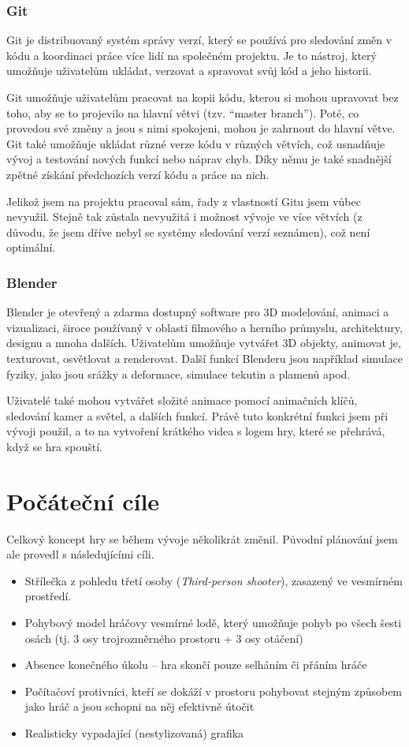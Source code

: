 \documentclass[12pt,a4paper,hidelinks]{article}
\begin{document}
\subsubsection{Git}
Git\cite{git} je distribuovaný systém správy verzí, který se používá pro sledování změn v kódu a koordinaci práce více lidí na společném projektu. Je to nástroj, který umožňuje uživatelům ukládat, verzovat a spravovat svůj kód a jeho historii.

Git umožňuje uživatelům pracovat na kopii kódu, kterou si mohou upravovat bez toho, aby se to projevilo na hlavní větvi (tzv. \enquote{master branch}). Poté, co provedou své změny a jsou s nimi spokojeni, mohou je zahrnout do hlavní větve. Git také umožňuje ukládat různé verze kódu v různých větvích, což usnadňuje vývoj a testování nových funkcí nebo náprav chyb. Díky němu je také snadnější zpětné získání předchozích verzí kódu a práce na nich.

Jelikož jsem na projektu pracoval sám, řady z vlastností Gitu jsem vůbec nevyužil. Stejně tak zůstala nevyužitá i možnost vývoje ve více větvích (z důvodu, že jsem dříve nebyl se systémy sledování verzí seznámen), což není optimální.

\subsubsection{Blender}
Blender\cite{blender} je otevřený a zdarma dostupný software pro 3D modelování, animaci a vizualizaci, široce používaný v oblasti filmového a herního průmyslu, architektury, designu a mnoha dalších. Uživatelům umožňuje vytvářet 3D objekty, animovat je, texturovat, osvětlovat a renderovat. Další funkcí Blenderu jsou například simulace fyziky, jako jsou srážky a deformace, simulace tekutin a plamenů apod.

Uživatelé také mohou vytvářet složité animace pomocí animačních klíčů, sledování kamer a světel, a dalších funkcí. Právě tuto konkrétní funkci jsem při vývoji použil, a to na vytvoření krátkého videa s logem hry, které se přehrává, když se hra spouští.
\clearpage

\section{Počáteční cíle}
Celkový koncept hry se během vývoje několikrát změnil. Původní plánování jsem ale provedl s následujícími cíli.
\begin{itemize}
	\item Střílečka z pohledu třetí osoby (\textit{Third-person shooter}), zasazený ve vesmírném prostředí.
	\item Pohybový model hráčovy vesmírné lodě, který umožňuje pohyb po všech šesti osách (tj. 3 osy trojrozměrného prostoru + 3 osy otáčení)
	\item Absence konečného úkolu – hra skončí pouze selháním či přáním hráče
	\item Počítačoví protivníci, kteří se dokáží v prostoru pohybovat stejným způsobem jako hráč a jsou schopni na něj efektivně útočit
	\item Realisticky vypadající (nestylizovaná) grafika
\end{itemize}
\end{document}
